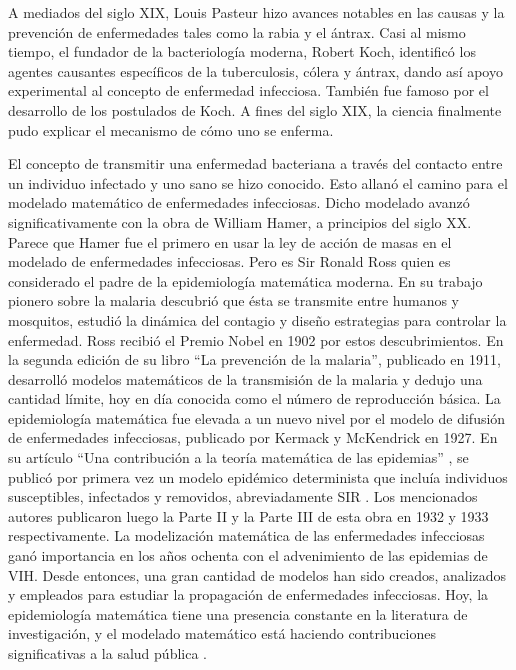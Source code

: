\documentclass{article}
\begin{document}
 A mediados del siglo XIX, Louis Pasteur hizo avances notables en las causas y la prevención de enfermedades tales como la rabia y el ántrax. Casi al mismo tiempo, el fundador de la bacteriología moderna, Robert Koch, identificó los agentes causantes específicos de la tuberculosis, cólera y ántrax, dando así apoyo experimental al concepto de enfermedad infecciosa. También fue famoso por el desarrollo de los postulados de Koch. A fines del siglo XIX, la ciencia finalmente pudo explicar el mecanismo de cómo uno se enferma. 

El concepto de transmitir una enfermedad bacteriana a través del contacto entre un individuo infectado y uno sano se hizo conocido. Esto allanó el camino para el modelado matemático de enfermedades infecciosas. Dicho modelado avanzó significativamente con la obra de William Hamer, a principios del siglo XX. Parece que Hamer fue el primero en usar la ley de acción de masas en el modelado de enfermedades infecciosas. Pero es Sir Ronald Ross quien es considerado el padre de la epidemiología matemática moderna. En su trabajo pionero sobre la malaria  descubrió que ésta se transmite entre humanos y mosquitos, estudió la dinámica del contagio y diseño estrategias para controlar la enfermedad. Ross recibió el Premio Nobel en 1902 por estos descubrimientos. En la segunda edición de su libro ``La prevención de la malaria'', publicado en 1911, desarrolló modelos matemáticos de la transmisión de la malaria y dedujo una cantidad límite, hoy en día conocida como el número de reproducción básica. 
La epidemiología matemática fue elevada a un nuevo nivel por el modelo de difusión de enfermedades infecciosas, publicado por Kermack y McKendrick en 1927. En su artículo ``Una contribución a la teoría matemática de las epidemias'' \cite{kermack1927contribution},  se publicó por primera vez un modelo epidémico determinista que incluía individuos susceptibles, infectados y removidos,  abreviadamente SIR \citep{dietz}.   Los mencionados autores publicaron luego la Parte II y la Parte III de esta obra en 1932 y 1933 respectivamente. La modelización matemática de las enfermedades infecciosas ganó importancia en los años ochenta con el advenimiento de las epidemias de VIH. Desde entonces, una gran cantidad de modelos han sido creados, analizados y empleados para estudiar la propagación de enfermedades infecciosas. Hoy, la epidemiología matemática tiene una presencia constante en la literatura de investigación, y el modelado matemático está haciendo contribuciones significativas a la salud pública \cite{hethcote1994thousand,vynnycky2010introduction}.
\end{document}
